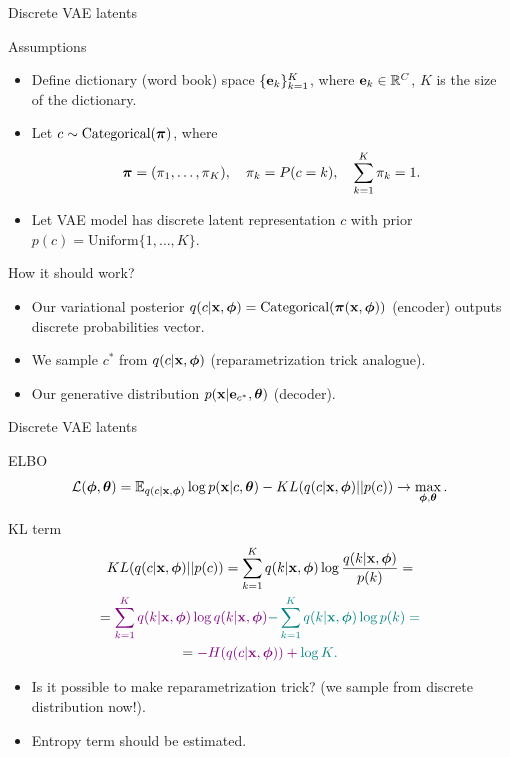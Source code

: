 \begin{frame}{Discrete VAE latents}
	\begin{block}{Assumptions}
		\begin{itemize}
			\item Define dictionary (word book) space $\{\mathbf{e}_k\}_{k=1}^K$, where $\mathbf{e}_k \in \mathbb{R}^C$, $K$ is the size of the dictionary.
			\item Let $c \sim \text{Categorical}(\boldsymbol{\pi})$, where 
			\vspace{-0.6cm}
			\[
			\boldsymbol{\pi} = (\pi_1, \dots, \pi_K), \quad \pi_k = P(c = k), \quad \sum_{k=1}^K \pi_k = 1.
			\]
			\vspace{-0.6cm}
			\item Let VAE model has discrete latent representation $c$ with prior $p(c) = \text{Uniform}\{1, \dots, K\}$.
		\end{itemize}
	\end{block}
	\vspace{-0.3cm}
	\begin{block}{How it should work?}
		\begin{itemize}
			\item Our variational posterior $q(c | \mathbf{x}, \boldsymbol{\phi}) = \text{Categorical}(\boldsymbol{\pi}(\mathbf{x}, \boldsymbol{\phi}))$ (encoder) outputs discrete probabilities vector.
			\item We sample $c^*$ from $q(c | \mathbf{x}, \boldsymbol{\phi})$ (reparametrization trick analogue).
			\item Our generative distribution $p(\mathbf{x} | \mathbf{e}_{c^*}, \boldsymbol{\theta})$ (decoder).
		\end{itemize}
	\end{block}
\end{frame}
\begin{frame}{Discrete VAE latents}
	\begin{block}{ELBO}
		\vspace{-0.5cm}
		\[
		\mathcal{L} (\boldsymbol{\phi}, \boldsymbol{\theta})  = \mathbb{E}_{q(c | \mathbf{x}, \boldsymbol{\phi})} \log p(\mathbf{x} | c, \boldsymbol{\theta}) - KL(q(c| \mathbf{x}, \boldsymbol{\phi}) || p(c)) \rightarrow \max_{\boldsymbol{\phi}, \boldsymbol{\theta}}.
		\]
		\vspace{-0.5cm}
	\end{block}
	\begin{block}{KL term}
		\vspace{-0.8cm}
		\begin{multline*}
			KL(q(c| \mathbf{x}, \boldsymbol{\phi}) || p(c)) = \sum_{k=1}^K q(k | \mathbf{x}, \boldsymbol{\phi}) \log \frac{q(k | \mathbf{x}, \boldsymbol{\phi})}{p(k)} = 
			\\ = \color{violet}{\sum_{k=1}^K q(k | \mathbf{x}, \boldsymbol{\phi}) \log q(k | \mathbf{x}, \boldsymbol{\phi})}  \color{teal}{- \sum_{k=1}^K q(k | \mathbf{x}, \boldsymbol{\phi}) \log p(k)}  = \\ = \color{violet}{- H(q(c | \mathbf{x}, \boldsymbol{\phi}))} + \color{teal}{\log K}. 
		\end{multline*}
		\vspace{-0.6cm}
	\end{block}
	\begin{itemize}
		\item Is it possible to make reparametrization trick? (we sample from discrete distribution now!).
		\item Entropy term should be estimated.
	\end{itemize}
\end{frame}
